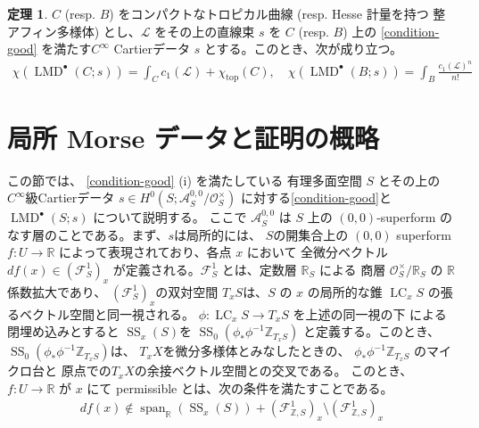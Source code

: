 \documentclass[uplatex,dvipdfmx,12pt]{jsarticle}
\numberwithin{equation}{section}
\theoremstyle{definition}
\newtheorem{theorem}{定理}[section]
\newcommand{\opn}[1]{\operatorname{#1}}
\newcommand{\beforesection}{\vspace{-15pt}}
\newcommand{\aftersection}{\vspace{-8pt}}
\begin{document}
\begin{theorem} \label{theorem-main}
$C$ (resp. $B$) をコンパクトなトロピカル曲線 (resp. Hesse 計量を持つ
整アフィン多様体) とし、$\mathcal{L}$ をその上の直線束
$s$ を $C$ (resp. $B$) 上の
\cref{condition-good} を満たす$C^{\infty}$
Cartierデータ $s$ 
とする。このとき、次が成り立つ。
\begin{align}
\chi(\opn{LMD}^{\bullet}(C;s))=\int_C c_1(\mathcal{L})+
\chi_{\opn{top}}(C), \quad
\chi(\opn{LMD}^{\bullet}(B;s))=\int_B \frac{c_1(\mathcal{L})^n}{n!}
\end{align}
\end{theorem}

\beforesection

\section{局所 Morse データと証明の概略}

\aftersection

この節では、
\cref{condition-good} (i) を満たしている
有理多面空間 $S$ とその上の$C^{\infty}$級Cartierデータ
$s\in H^{0}(S;\mathcal{A}_{S}^{0,0}/\mathcal{O}^{\times}_S)$
に対する\cref{condition-good}と 
$\opn{LMD}^{\bullet}(S;s)$ について説明する。
ここで $\mathcal{A}^{0,0}_S$ は $S$ 上の $(0,0)$-superform
のなす層のことである\cite{MR3903579}。まず、$s$は局所的には、
$S$の開集合上の 
$(0,0)$ superform $f\colon U\to \mathbb{R}$
によって表現されており、各点 $x$ において
全微分ベクトル $df(x)\in(\mathcal{F}_{S}^{1})_x$ 
が定義される。$\mathcal{F}_{S}^{1}$ とは、定数層
$\mathbb{R}_S$ による
商層 $\mathcal{O}^{\times}_{S}/\mathbb{R}_{S}$ 
の $\mathbb{R}$ 係数拡大であり、
$(\mathcal{F}_{S}^{1})_x$の双対空間
$T_x S$は、$S$ の $x$ の局所的な錐
$\opn{LC}_x S$ の張るベクトル空間と同一視される。
$\phi \colon \opn{LC}_x S\to T_x S$ を上述の同一視の下
による閉埋め込みとすると
$\opn{SS}_x (S)$を
$\opn{SS}_0(\phi_* \phi^{-1}\mathbb{Z}_{T_x S})$
と定義する。このとき、
$\opn{SS}_0(\phi_* \phi^{-1}\mathbb{Z}_{T_x S})$は、
$T_x X$を微分多様体とみなしたときの、
$\phi_* \phi^{-1}\mathbb{Z}_{T_x S}$ のマイクロ台と
原点での$T_x X$の余接ベクトル空間との交叉である。
このとき、
$f\colon U \to \mathbb{R}$ が $x$ にて permissible
とは、次の条件を満たすことである。
\begin{align}
df(x)\notin\opn{span}_{\mathbb{R}}(\opn{SS}_x(S))+
(\mathcal{F}_{\mathbb{Z},S}^{1})_x 
\setminus (\mathcal{F}_{\mathbb{Z},S}^{1})_x
\end{align}
\end{document}
